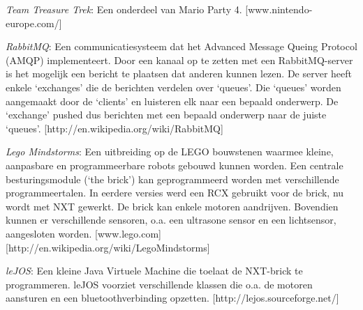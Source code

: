 \documentclass[tt2]{penoverslag}
\begin{document}
\newpage
\begin{thebibliography}{9}
\textit{Team Treasure Trek}: Een onderdeel van Mario Party 4. \mbox{[www.nintendo-europe.com/]}

\textit{RabbitMQ}: Een communicatiesysteem dat het Advanced Message Queing Protocol (AMQP) implementeert. Door een kanaal op te zetten met een RabbitMQ-server is het mogelijk een bericht te plaatsen dat anderen kunnen lezen. De server heeft enkele `exchanges' die de berichten verdelen over `queues'. Die `queues' worden aangemaakt door de `clients' en luisteren elk naar een bepaald onderwerp. De `exchange' pushed dus berichten met een bepaald onderwerp naar de juiste `queues'.
\mbox{[http://en.wikipedia.org/wiki/RabbitMQ]}

\textit{Lego Mindstorms}:  Een uitbreiding op de LEGO bouwstenen waarmee kleine, aanpasbare en programmeerbare robots gebouwd kunnen worden. Een centrale besturingsmodule (`the brick') kan geprogrammeerd worden met verschillende programmeertalen. In eerdere versies werd een RCX gebruikt voor de brick, nu wordt met NXT gewerkt. De brick kan enkele motoren aandrijven. Bovendien kunnen er verschillende sensoren, o.a. een ultrasone sensor en een lichtsensor, aangesloten worden.  \mbox{[www.lego.com]} \mbox{[http://en.wikipedia.org/wiki/Lego\textendash Mindstorms]}

\textit{leJOS}: Een kleine Java Virtuele Machine die toelaat de NXT-brick te programmeren. leJOS voorziet verschillende klassen die o.a. de motoren aansturen en een bluetoothverbinding opzetten.  \mbox{[http://lejos.sourceforge.net/]}



\end{thebibliography}
\end{document}
